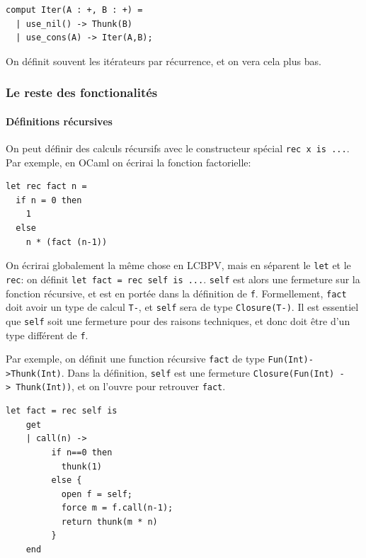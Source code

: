 \documentclass[12pt]{article}
\begin{document}
\begin{verbatim}
comput Iter(A : +, B : +) =
  | use_nil() -> Thunk(B)
  | use_cons(A) -> Iter(A,B);
\end{verbatim}

On définit souvent les itérateurs par récurrence, et on vera cela plus
bas.

\hypertarget{le-reste-des-fonctionalituxe9s}{%
      \subsubsection*{Le reste des
            fonctionalités}\label{le-reste-des-fonctionalituxe9s}}

\hypertarget{duxe9finitions-ruxe9cursives}{%
      \paragraph*{Définitions
            récursives}\label{duxe9finitions-ruxe9cursives}}

On peut définir des calculs récursifs avec le constructeur spécial
\texttt{rec\ x\ is\ ...}. Par exemple, en OCaml on écrirai la fonction
factorielle:

\begin{verbatim}
let rec fact n = 
  if n = 0 then
    1 
  else 
    n * (fact (n-1))
\end{verbatim}

On écrirai globalement la même chose en LCBPV, mais en séparent le
\texttt{let} et le \texttt{rec}: on définit
\texttt{let\ fact\ =\ rec\ self\ is\ ...}. \texttt{self} est alors une
fermeture sur la fonction récursive, et est en portée dans la définition
de \texttt{f}. Formellement, \texttt{fact} doit avoir un type de calcul
\texttt{T-}, et \texttt{self} sera de type \texttt{Closure(T-)}. Il est
essentiel que \texttt{self} soit une fermeture pour des raisons
techniques, et donc doit être d'un type différent de \texttt{f}.

Par exemple, on définit une function récursive \texttt{fact} de type
\texttt{Fun(Int)-\textgreater{}Thunk(Int)}. Dans la définition,
\texttt{self} est une fermeture
\texttt{Closure(Fun(Int)\ -\textgreater{}\ Thunk(Int))}, et on l'ouvre
pour retrouver \texttt{fact}.

\newpage

\begin{verbatim}
let fact = rec self is
    get
    | call(n) -> 
         if n==0 then 
           thunk(1) 
         else {
           open f = self;
           force m = f.call(n-1);
           return thunk(m * n)
         }
    end
\end{verbatim}
\end{document}
